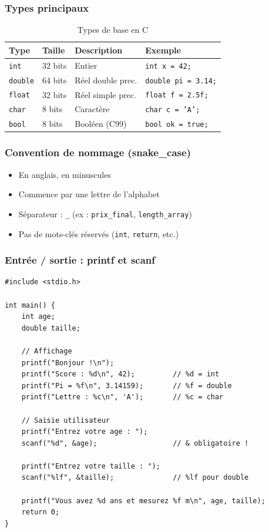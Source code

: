 \documentclass[12pt,a4paper]{article}
\begin{document}
\subsubsection{Types principaux}

\begin{table}[h!]
\centering
\caption{Types de base en C}
\begin{tabular}{llll}
\toprule
\textbf{Type} & \textbf{Taille} & \textbf{Description} & \textbf{Exemple} \\
\midrule
\texttt{int}    & 32 bits & Entier           & \texttt{int x = 42;} \\
\texttt{double} & 64 bits & Réel double prec. & \texttt{double pi = 3.14;} \\
\texttt{float}  & 32 bits & Réel simple prec. & \texttt{float f = 2.5f;} \\
\texttt{char}   & 8 bits  & Caractère        & \texttt{char c = 'A';} \\
\texttt{bool}   & 8 bits  & Booléen (C99)    & \texttt{bool ok = true;} \\
\bottomrule
\end{tabular}
\end{table}

\subsubsection{Convention de nommage (snake\_case)}

\begin{itemize}
    \item En anglais, en minuscules
    \item Commence par une lettre de l'alphabet
    \item Séparateur : \texttt{\_} (ex : \texttt{prix\_final}, \texttt{length\_array})
    \item Pas de mots-clés réservés (\texttt{int}, \texttt{return}, etc.)
\end{itemize}

\subsubsection{Entrée / sortie : printf et scanf}

\begin{lstlisting}[caption={Entrées et sorties en C}]
#include <stdio.h>

int main() {
    int age;
    double taille;

    // Affichage
    printf("Bonjour !\n");
    printf("Score : %d\n", 42);         // %d = int
    printf("Pi = %f\n", 3.14159);       // %f = double
    printf("Lettre : %c\n", 'A');       // %c = char

    // Saisie utilisateur
    printf("Entrez votre age : ");
    scanf("%d", &age);                  // & obligatoire !

    printf("Entrez votre taille : ");
    scanf("%lf", &taille);              // %lf pour double

    printf("Vous avez %d ans et mesurez %f m\n", age, taille);
    return 0;
}
\end{lstlisting}
\end{document}
